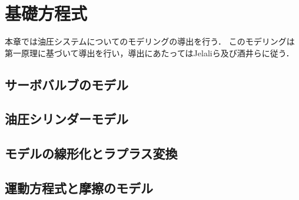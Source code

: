 \chapter{基礎方程式}
本章では油圧システムについてのモデリングの導出を行う．
このモデリングは第一原理に基づいて導出を行い，導出にあたってはJelaliら\cite{}及び酒井ら\cite{}に従う．

\section{サーボバルブのモデル}

\section{油圧シリンダーモデル}

\section{モデルの線形化とラプラス変換}

\section{運動方程式と摩擦のモデル}